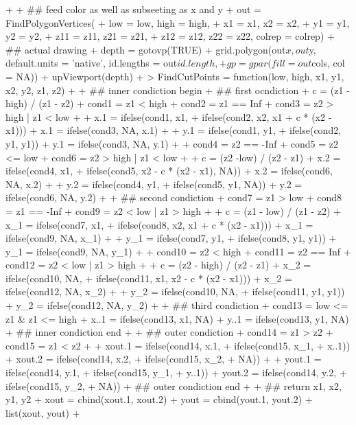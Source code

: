 \documentclass[paper=a4, fontsize=11pt]{report}
\begin{document}
\begin{Schunk}
\begin{Sinput}
{+     
+     ## feed color as well as subseeting as x and y
+     out = FindPolygonVertices(
+                 low = low, high = high,
+                 x1 = x1, x2 = x2, 
+                 y1 = y1, y2 = y2,
+                 z11 = z11, z21 = z21, 
+                 z12 = z12, z22 = z22, colrep = colrep)
+     ## actual drawing
+     depth = gotovp(TRUE)
+     grid.polygon(out$x, out$y, default.units = 'native', id.lengths = out$id.length,
+              gp = gpar(fill = out$cols, col = NA))
+     upViewport(depth)
+ }
> FindCutPoints = function(low, high, x1, y1, x2, y2, z1, z2)
+ {
+ ## inner condiction begin
+     ## first ocndiction
+     c = (z1 - high) / (z1 - z2)
+     cond1 = z1 < high
+     cond2 = z1 == Inf
+     cond3 = z2 > high | z1 < low
+     
+     x.1 = ifelse(cond1, x1, 
+               ifelse(cond2, x2, x1 + c * (x2 - x1)))
+     x.1 = ifelse(cond3, NA, x.1)
+                 
+     y.1 = ifelse(cond1, y1, 
+                ifelse(cond2, y1, y1))
+     y.1 = ifelse(cond3, NA, y.1)
+     
+     cond4 = z2 == -Inf
+     cond5 = z2 <= low
+     cond6 = z2 > high | z1 < low
+ 
+     c = (z2 -low) / (z2 - z1)
+     x.2 = ifelse(cond4, x1,
+              ifelse(cond5, x2 - c * (x2 - x1), NA))
+     x.2 = ifelse(cond6, NA, x.2)
+              
+     y.2 = ifelse(cond4, y1,
+               ifelse(cond5, y1, NA))
+     y.2 = ifelse(cond6, NA, y.2)
+ 
+     ## second condiction
+     cond7 = z1 > low
+     cond8 = z1 == -Inf
+     cond9 = z2 < low | z1 > high
+     
+     c = (z1 - low) / (z1 - z2)
+     x_1 = ifelse(cond7, x1, 
+                 ifelse(cond8, x2, x1 + c * (x2 - x1)))
+     x_1 = ifelse(cond9, NA, x_1)
+                 
+     y_1 = ifelse(cond7, y1, 
+                 ifelse(cond8, y1, y1))
+     y_1 = ifelse(cond9, NA, y_1)
+     
+     cond10 = z2 < high
+     cond11 = z2 == Inf
+     cond12 = z2 < low | z1 > high
+                 
+     c = (z2 - high) / (z2 - z1)
+     x_2 = ifelse(cond10, NA, 
+                 ifelse(cond11, x1, x2 - c * (x2 - x1)))
+     x_2 = ifelse(cond12, NA, x_2)
+                 
+     y_2 = ifelse(cond10, NA, 
+                 ifelse(cond11, y1, y1))
+     y_2 = ifelse(cond12, NA, y_2)
+                 
+     ## third condiction
+     cond13 = low <= z1 & z1 <= high
+     x..1 = ifelse(cond13, x1, NA)
+     y..1 = ifelse(cond13, y1, NA)
+ ## inner condiction end
+     
+ ## outer condiction 
+     cond14 = z1 > z2
+     cond15 = z1 < z2
+ 
+     xout.1 = ifelse(cond14, x.1,
+                 ifelse(cond15, x_1,
+                         x..1))
+     xout.2 = ifelse(cond14, x.2,
+                 ifelse(cond15, x_2,
+                         NA))						
+ 
+     yout.1 = ifelse(cond14, y.1,
+                 ifelse(cond15, y_1,
+                         y..1))
+     yout.2 = ifelse(cond14, y.2,
+                 ifelse(cond15, y_2,
+                         NA))			
+ ## outer condiction end
+ 
+     ## return x1, x2, y1, y2
+     xout = cbind(xout.1, xout.2)
+     yout = cbind(yout.1, yout.2)
+     list(xout, yout)
+ }
\end{Sinput}
\end{Schunk}
\end{document}
